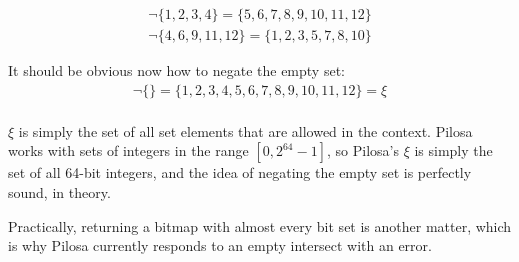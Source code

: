 \documentclass{article}
\begin{document}
\begin{align} 
\neg \{1, 2, 3, 4\} = \{5, 6, 7, 8, 9, 10, 11, 12\}\\
\neg \{4, 6, 9, 11, 12\} = \{1, 2, 3, 5, 7, 8, 10\}
\end{align}

It should be obvious now how to negate the empty set:
\begin{align} 
\neg \{\} = \{1, 2, 3, 4, 5, 6, 7, 8, 9, 10, 11, 12\} = \xi\\
\end{align}

$\xi$ is simply the set of all set elements that are allowed in the context. Pilosa works with sets of integers in the range $[0, 2^{64}-1]$, so Pilosa's $\xi$ is simply the set of all 64-bit integers, and the idea of negating the empty set is perfectly sound, in theory. 

Practically, returning a bitmap with almost every bit set is another matter, which is why Pilosa currently responds to an empty intersect with an error.
\end{document}
